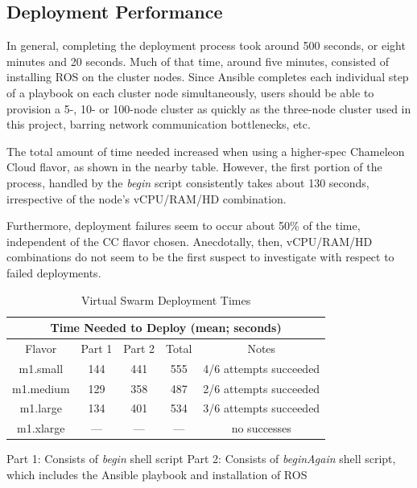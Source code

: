 \documentclass[9pt,twocolumn,twoside]{../../styles/osajnl}
\begin{document}
\subsection{Deployment Performance}
In general, completing the deployment process took around 500 seconds, or eight minutes and 20 seconds.  Much of that time, around five minutes, consisted of installing ROS on the cluster nodes.  Since Ansible completes each individual step of a playbook on each cluster node simultaneously, users should be able to provision a 5-, 10- or 100-node cluster as quickly as the three-node cluster used in this project, barring network communication bottlenecks, etc. 

The total amount of time needed increased when using a higher-spec Chameleon Cloud flavor, as shown in the nearby table.  However, the first portion of the process, handled by the \textit{begin} script consistently takes about 130 seconds, irrespective of the node's vCPU/RAM/HD combination.  

Furthermore, deployment failures seem to occur about 50\% of the time, independent of the CC flavor chosen.  Anecdotally, then, vCPU/RAM/HD combinations do not seem to be the first suspect to investigate with respect to failed deployments.

\begin{table} [htbp]
  \begin{threeparttable}
  \centering
  \caption{Virtual Swarm Deployment Times}
    \begin{tabular}{ccccc}
      \multicolumn{5}{c}{\bf Time Needed to Deploy (mean; seconds)}\\ \hline Flavor & Part 1 & Part 2 & Total & Notes\\ \hline m1.small & 144 & 441 & 555 & 4/6 attempts succeeded \\ m1.medium & 129 & 358 & 487 & 2/6 attempts succeeded \\ m1.large & 134 & 401 & 534 & 3/6 attempts succeeded \\ m1.xlarge & --- & --- & --- & no successes\\ \hline
    \end{tabular}
    \begin{tablenotes}
      \small
      \item Part 1: Consists of \textit{begin} shell script \newline  Part 2: Consists of \textit{beginAgain} shell script, which includes the Ansible playbook and installation of ROS 
    \end{tablenotes}
  \end{threeparttable}
\end{table}
\end{document}
